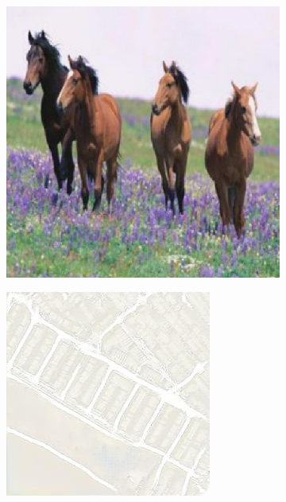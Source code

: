 \begin{figure}
  \medskip

  \begin{subfigure}[t]{.2\textwidth}
    \centering
    \includegraphics[width=\linewidth]{images/cycleGanResults/horse_input1.png}
  \end{subfigure}
  \begin{subfigure}[t]{.2\textwidth}
    \centering
    \includegraphics[width=\linewidth]{images/cycleGanResults/Maps6Ld120_E100_Lr0002.jpg}

\end{subfigure}
\end{figure}
